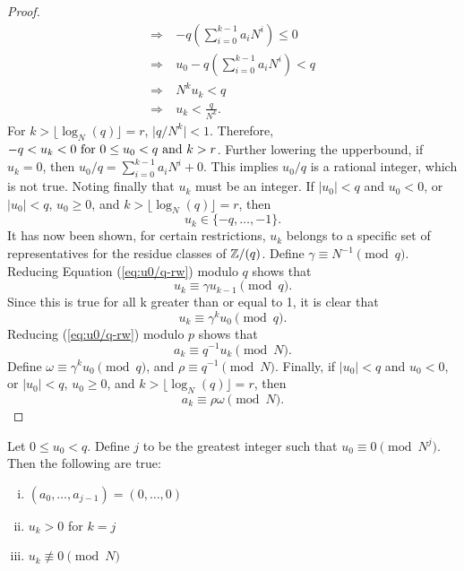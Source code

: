\begin{proof}
\begin{align*}
    \Rightarrow &-q\left(\sum_{i=0}^{k-1}a_iN^i\right) \leq 0 \\
    \Rightarrow \ &u_0-q\left(\sum_{i=0}^{k-1}a_iN^i\right)<q \\
    \Rightarrow \ &N^ku_k<q \\
    \Rightarrow \ &u_k<\frac{q}{N^k}.
  \end{align*}
  For $k>\lfloor\log_N(q)\rfloor=r$, $\lvert q/N^k \rvert < 1$. Therefore,
  $-q < u_k < 0 \ {\rm for} \ 0\leq u_0 < q \ {\rm and} \ k>r$.
  Further lowering the upperbound, if $u_k=0$, then
  $u_0/q=\sum_{i=0}^{k-1}a_iN^i+0$. This implies $u_0/q$ is a rational
  integer, which is not true. Noting finally that $u_k$ must be an integer.
  If $\lvert u_0 \rvert<q$ and $u_0<0$, or $\lvert u_0 \rvert<q$,
  $u_0\geq0$, and $k>\lfloor \log_N(q) \rfloor=r$, then
  \begin{equation*}
    u_k \in \{-q,\dots,-1\}.
  \end{equation*}
  It has now been shown, for certain restrictions, $u_k$ belongs to a
  specific set of representatives for the residue classes of $\mathbb{Z}/(q)$.
  Define $\gamma \equiv N^{-1} \pmod q$. Reducing Equation
  (\ref{eq:u0/q-rw}) modulo $q$ shows that
  \begin{equation}
    u_k \equiv \gamma u_{k-1} \pmod q.
  \end{equation}
  Since this is true for all k greater than or equal to 1, it is clear that
  \begin{equation}\label{eq:uk-mod-q}
    u_k \equiv \gamma^ku_0 \pmod q.
  \end{equation}
  Reducing (\ref{eq:u0/q-rw}) modulo $p$ shows that
  \begin{equation}\label{eq:ak-mod-p}
    a_k \equiv q^{-1}u_k \pmod N.
  \end{equation}
  Define $\omega \equiv \gamma^k u_0 \pmod q$, and
  $\rho \equiv q^{-1} \pmod N$.  Finally, if $\lvert u_0 \rvert<q$ and
  $u_0<0$, or $\lvert u_0 \rvert<q$, $u_0\geq0$, and
  $k>\lfloor \log_N(q) \rfloor=r$, then
  \begin{equation}\label{eq:ak-done}
    a_k \equiv \rho\omega \pmod N.
  \end{equation}
\end{proof}
\begin{corollary}\label{cor:aj}
  Let $0\leq u_0 < q$. Define $j$ to be the greatest integer such that
  $u_0 \equiv 0 \pmod{N^j}$. Then the following are true:
  \begin{enumerate}[i.]
    \item $(a_0,\dots,a_{j-1})=(0,\dots,0)$
    \item $u_k>0$ for $k=j$
    \item $u_k \not\equiv 0 \pmod N$
  \end{enumerate}
\end{corollary}

